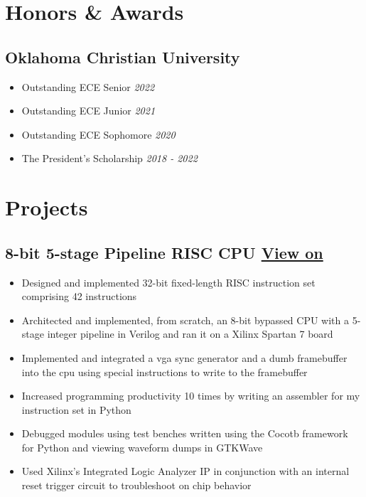 \documentclass{article}
\begin{document}
\begin{spacing}{.5}
\section{Honors \& Awards}
	\subsection{Oklahoma Christian University}
		\begin{itemize}[label=$\bullet$,itemsep=-.35ex]
			\item \large{Outstanding ECE Senior} \hfill \small{\textsl{2022}}
			\item \large{Outstanding ECE Junior} \hfill \small{\textsl{2021}}
			\item \large{Outstanding ECE Sophomore} \hfill \small{\textsl{2020}}
			\item \large{The President's Scholarship} \hfill \small{\textsl{2018 - 2022}}
		\end{itemize}

\section{Projects}
	\subsection{8-bit 5-stage Pipeline RISC CPU \hspace{.1cm} \href{https://github.com/ZachWWalden/HdlMicroProcessor}{View on \faGithub} \hfill {}}
		\begin{itemize}[label=--,itemsep=-.35ex]
			\item \large{Designed and implemented 32-bit fixed-length RISC instruction set comprising 42 instructions}
			\item \large{Architected and implemented, from scratch, an 8-bit bypassed CPU with a 5-stage integer pipeline in Verilog and ran it on a Xilinx Spartan 7 board}
			\item \large{Implemented and integrated a vga sync generator and a dumb framebuffer into the cpu using special instructions to write to the framebuffer}
			\item \large{Increased programming productivity 10 times by writing an assembler for my instruction set in Python}
			\item \large{Debugged modules using test benches written using the Cocotb framework for Python and viewing waveform dumps in GTKWave}
			\item \large{Used Xilinx's Integrated Logic Analyzer IP in conjunction with an internal reset trigger circuit to troubleshoot on chip behavior}
		\end{itemize}

\end{spacing}
\end{document}
